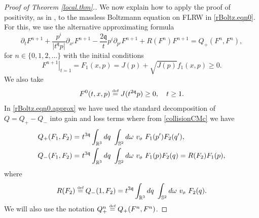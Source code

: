\documentclass[reqno]{amsart}
\newcommand{\eqdef }{\overset{\mbox{\tiny{def}}}{=}}
\newcommand{\pv}{p}
\newcommand{\qq}{\mathfrak{q}}
\newcommand{\tqq}{t^{2\qq}}
\newcommand{\tTq}{t^{3\qq}}
\newcommand{\Emptyset}{\text{\o}}
\theoremstyle{definition}
\numberwithin{equation}{section}
\numberwithin{theorem}{section}
\begin{document}
\begin{proof}[Proof of Theorem \ref{local.thm}.]
We now explain how to apply the  proof of positivity, as in \cite{Ukai-86}, to the massless Boltzmann equation on FLRW in \eqref{rBoltz.eqn0}.  For this, we use the  alternative approximating formula
\begin{equation}
    \partial_t F^{n+1}+\frac{\pv^i}{|t^\qq\pv|} \partial_{x^i} F^{n+1}
    - \frac{2 \qq}{t} p^i \partial_{p^i} F^{n+1} 
    + R(F^{n})F^{n+1}
    =Q_+(F^{n},F^{n}),  
\label{rBoltz.eqn0.approx}
\end{equation}
for $n\in\{0,1, 2, \ldots\}$
with the initial conditions 
\begin{equation*}
   \left. F^{n+1}\right|_{t=1} =  F_1(x,\pv)= J(\pv) + \sqrt{J(\pv)} f_1(x,\pv) \geq 0.
\end{equation*}
We also take
\begin{equation}\label{first.step}
 F^{0}(t,x,\pv)\eqdef J(\tqq\pv) \geq 0, \quad t \geq 1.
\end{equation}
In \eqref{rBoltz.eqn0.approx} we have used the standard decomposition of 
$
Q
=
Q_+ - Q_-
$
into gain and loss terms where from \eqref{collisionCMc} we have 
\begin{equation}\notag
\begin{split}
Q_+(F_1,F_2)
= &~ 
\tTq\int_{\mathbb{R}^3}  {dq}  ~
\int_{\mathbb{S}^{2}} d\omega 
~ v_{\Emptyset}   ~ F_1(p^{\prime })F_2(q^{\prime}),
\\
Q_-(F_1,F_2)
= &~ 
\tTq\int_{\mathbb{R}^3}  {dq}  ~
\int_{\mathbb{S}^{2}} d\omega 
~ v_{\Emptyset} ~ F_1(p)F_2(q) = R(F_2)F_1(p),
\end{split}
\end{equation}
where
\begin{align*}
    R(F_2) \eqdef Q_-(1,F_2)
    =
    \tTq\int_{\mathbb{R}^3}  {dq}  ~
\int_{\mathbb{S}^{2}} d\omega 
~ v_{\Emptyset} ~ F_2(q).
\end{align*}
We will also use the notation $Q_+^{n} \eqdef Q_+(F^{n},F^{n})$.




\end{proof}
\end{document}
